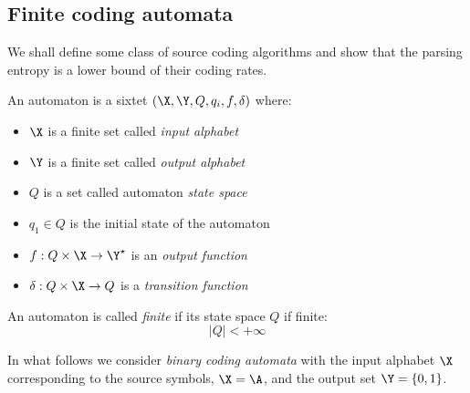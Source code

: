 \documentclass[toc, titlepaged]{../cs-classes/cs-classes}
\begin{document}
\subsection{Finite coding automata}
We shall define some class of source coding algorithms and show that the parsing entropy is a lower bound of their coding rates.

\begin{definition}[Automaton]
    An automaton is a sixtet $(\X, \Y, Q, q_i, f, \delta)$ where:
    \begin{itemize}
        \item $\X$ is a finite set called \emph{input alphabet}
        \item $\Y$ is a finite set called \emph{output alphabet}
        \item $Q$ is a set called automaton \emph{state space}
        \item $q_1\in Q$ is the initial state of the automaton
        \item $f:Q\times\X\rightarrow\Y^\star$ is an \emph{output function}
        \item $\delta:Q\times\X\rightarrow Q$ is a \emph{transition function}
    \end{itemize}
\end{definition}

\begin{definition}
    An automaton is called \emph{finite} if its state space $Q$ if finite:
    \begin{equation*}
        |Q|<+\infty
    \end{equation*}
\end{definition}

In what follows we consider \emph{binary coding automata} with the input alphabet $\X$ corresponding to the source symbols, $\X=\A$, and the output set $\Y=\{0, 1\}$.
\end{document}
